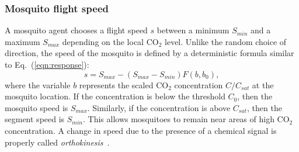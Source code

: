 \documentclass[10pt]{article}
\begin{document}
\subsubsection*{Mosquito flight speed}
A mosquito agent chooses a flight speed $s$ between a minimum $S_{min}$ and a maximum $S_{max}$ depending on the local $\mbox{CO}_2$ level. Unlike the random choice of direction, the speed of the mosquito is defined by a deterministic formula similar to Eq.~(\ref{eqn:response}):
\begin{equation*}
	s = S_{max} - (S_{max} -  S_{min})F(b, b_0),
\end{equation*}
where the variable $b$ represents the scaled $\mbox{CO}_2$ concentration $C/C_{sat}$ at the mosquito location.  If the concentration is below the threshold $C_0$, then the mosquito speed is $S_{max}$.  Similarly, if the concentration is above $C_{sat}$, then the segment speed is $S_{min}$.  This allows mosquitoes to remain near areas of high $\mbox{CO}_2$ concentration.  A change in speed due to the presence of a chemical signal is properly called \textit{orthokinesis}~\cite{Pierce-Shimomura1999}.

\end{document}
